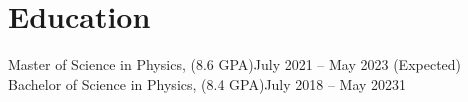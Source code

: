 
\section{Education}
\resumeHeadingListStart{}
{Master of Science in Physics, (8.6 GPA)}{July 2021 -- May 2023 (Expected)}
\resumeHeadingListEnd{}
\resumeHeadingListStart{}
{Bachelor of Science in Physics, (8.4 GPA)}{July 2018 -- May 20231}
\resumeHeadingListEnd{}